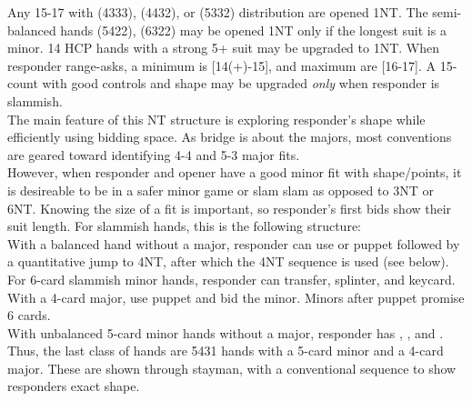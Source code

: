 \documentclass[12pt]{report}
\newcommand{\n}{\\}
\begin{document}
    Any 15-17 with (4333), (4432), or (5332) distribution are opened 1NT.  The semi-balanced hands (5422), (6322) may be opened 1NT only if the longest suit is a minor. 14 HCP hands with a strong 5+ suit may be upgraded to 1NT.  When responder range-asks, a minimum is [14(+)-15], and maximum are [16-17].  A 15-count with good controls and shape may be upgraded \textit{only} when responder is slammish.
    \\

    The main feature of this NT structure is exploring responder's shape while efficiently using bidding space.  As bridge is about the majors, most conventions are geared toward identifying 4-4 and 5-3 major fits.\n

    However, when responder and opener have a good minor fit with shape/points, it is desireable to be in a safer minor game or slam slam as opposed to 3NT or 6NT.  Knowing the size of a fit is important, so responder's first bids show their suit length. For slammish hands, this is the following structure: \n
    
    With a balanced hand without a major, responder can use  or  puppet followed by a quantitative jump to 4NT, after which the 4NT sequence is used (see below). \n
    
    For 6-card slammish minor hands, responder can transfer, splinter, and keycard.  With a 4-card major, use puppet and bid the minor.  Minors after puppet promise 6 cards. \n

    With unbalanced 5-card minor hands without a major, responder has , , and .  Thus, the last class of hands are 5431 hands with a 5-card minor and a 4-card major.  These are shown through  stayman, with a conventional sequence to show responders exact shape. \n\n
\end{document}
